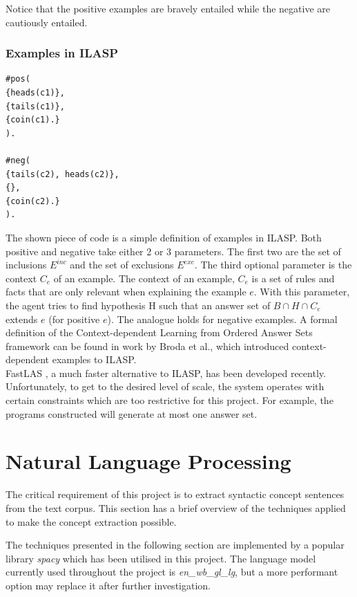 Notice that the positive examples are bravely entailed while the negative are cautiously entailed.\\

\subsubsection{Examples in ILASP}
\label{examples-in-ilasp}

\begin{verbatim}
#pos(
{heads(c1)},
{tails(c1)},
{coin(c1).}
).

#neg(
{tails(c2), heads(c2)},
{},
{coin(c2).}
).
\end{verbatim}

The shown piece of code is a simple definition of examples in ILASP. 
Both positive and negative take either 2 or 3 parameters. The first two are the set of inclusions $E^{inc}$ and the set of exclusions $E^{exc}$.
The third optional parameter is the context $C_e$ of an example.
The context of an example, $C_e$ is a set of rules and facts that are only relevant when explaining the example $e$.
With this parameter, the agent tries to find hypothesis H such that an answer set of $B \cap H \cap C_e$ extends $e$ (for positive $e$).
The analogue holds for negative examples. 
A formal definition of the Context-dependent Learning from Ordered Answer Sets framework can be found in work by Broda et al., \cite{RefWorks:RefID:56-broda2016iterative} which introduced context-dependent examples to ILASP. \\

FastLAS \cite{RefWorks:RefID:19-law2020fastlas:}, a much faster alternative to ILASP, has been developed recently.
Unfortunately, to get to the desired level of scale, the system operates with certain constraints which are too restrictive for this project.
For example, the programs constructed will generate at most one answer set.


\section{Natural Language Processing}

The critical requirement of this project is to extract syntactic concept sentences from the text corpus.
This section has a brief overview of the techniques applied to make the concept extraction possible.

The techniques presented in the following section are implemented by a popular library \emph{spacy} \cite{RefWorks:RefID:24-spacy} which has been utilised in this project. 
The language model currently used throughout the project is \emph{en\_wb\_gl\_lg}, but a more performant option may replace it after further investigation.


